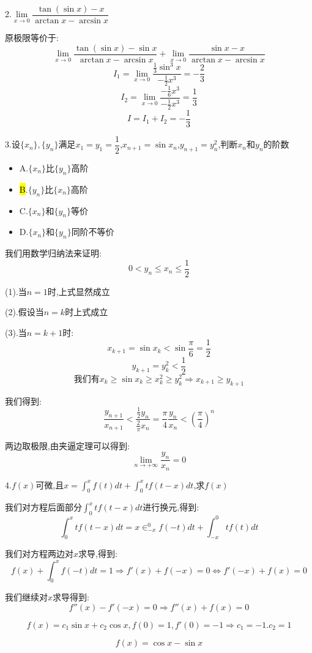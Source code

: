 
2.$\lim\limits_{x\rightarrow 0}\dfrac{\tan(\sin x)-x}{\arctan x-\arcsin x}$
\begin{solution}
	
	原极限等价于: 
	$$\lim\limits_{x\rightarrow 0}\dfrac{\tan(\sin x)-\sin x}{\arctan x-\arcsin x}+\lim\limits_{x\rightarrow 0}\dfrac{\sin x-x}{\arctan x-\arcsin x}$$
	$$I_{1}=\lim\limits_{x\rightarrow 0}\dfrac{\frac{1}{3}\sin^3 x}{-\frac{1}{2}x^3}=-\frac{2}{3}$$
	$$I_{2}=\lim\limits_{x\rightarrow 0}\dfrac{-\frac{1}{6} x^3}{-\frac{1}{2}x^3}=\frac{1}{3}$$
	$$I=I_{1}+I_{2}=-\frac{1}{3}$$
\end{solution}


3.设$\{x_{n}\},\{y_{n}\}$满足$x_{1}=y_{1}=\dfrac{1}{2}$,$x_{n+1}=\sin x_{n}$,$y_{n+1}=y_{n}^2$,判断$x_{n}$和$y_{n}$的阶数
\begin{itemize}
	\item A.$\{x_{n}\}\text{比}\{y_{n}\}\text{高阶}$
	\item \hl{B}.$\{y_{n}\}\text{比}\{x_{n}\}\text{高阶}$
	\item C.$\{x_{n}\}\text{和}\{y_{n}\}\text{等价}$
	\item D.$\{x_{n}\}\text{和}\{y_{n}\}\text{同阶不等价}$
\end{itemize}
\begin{solution}
	
	我们用数学归纳法来证明: 
	$$0<y_{n}\leq x_{n}\leq \frac{1}{2}$$
	
	(1).当$n=1$时,上式显然成立
	
	(2).假设当$n=k$时上式成立
	
	(3).当$n=k+1$时: 
	$$x_{k+1}=\sin x_{k}<\sin \frac{\pi}{6}=\frac{1}{2}$$
	$$y_{k+1}=y_{k}^2<\frac{1}{2}$$
	$$\text{我们有}x_{k}\geq \sin x_{k}\geq x_{k}^2\geq y_{k}^2\Rightarrow x_{k+1}\geq y_{k+1}$$
	
	我们得到: 
	$$\dfrac{y_{n+1}}{x_{n+1}}<\dfrac{\frac{1}{2}y_{n}}{\frac{2}{\pi}x_{n}}=\dfrac{\pi}{4}\dfrac{y_{n}}{x_{n}}<(\dfrac{\pi}{4})^n$$
	
	两边取极限,由夹逼定理可以得到: 
	$$\lim\limits_{n\rightarrow +\infty}\frac{y_{n}}{x_{n}}=0$$
\end{solution}


4.$f(x)$可微,且$x=\int_{0}^{x}f(t)dt+\int_{0}^{x}tf(t-x)dt$,求$f(x)$
\begin{solution}
	
	我们对方程后面部分$\int_{0}^{x}tf(t-x)dt$进行换元,得到: 
	$$\int_{0}^{x}tf(t-x)dt=x\in_{-x}^{0}f(-t)dt+\int_{-x}^{0}tf(t)dt$$
	
	我们对方程两边对$x$求导,得到: 
	$$f(x)+\int_{0}^{x}f(-t)dt=1\Rightarrow f'(x)+f(-x)=0\Leftrightarrow f'(-x)+f(x)=0$$
	
	我们继续对$x$求导得到: 
	$$f''(x)-f'(-x)=0\Rightarrow f''(x)+f(x)=0$$
	
	$$f(x)=c_{1}\sin x+c_{2}\cos x,f(0)=1,f'(0)=-1\Rightarrow c_{1}=-1.c_{2}=1$$
	
	$$f(x)=\cos x-\sin x$$
\end{solution}

